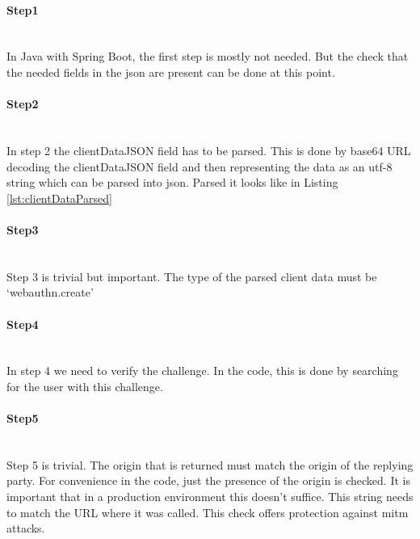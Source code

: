 \documentclass[a4paper, 11pt]{scrartcl}
\begin{document}


\paragraph{Step1} \hfill \\ 
In Java with Spring Boot, the first step is mostly not needed. But the check that the needed fields in the \gls{json} are present can be done at this point.

\paragraph{Step2} \hfill \\ 
In step 2 the clientDataJSON field has to be parsed. This is done by \gls{base64} URL decoding the clientDataJSON field and then representing the data as an \gls{utf-8} string which can be parsed into \gls{json}. Parsed it looks like in Listing \ref{lst:clientDataParsed}



\paragraph{Step3}\hfill \\ 
Step 3 is trivial but important. The type of the parsed client data must be `webauthn.create'

\paragraph{Step4}\hfill \\ 
In step 4 we need to verify the challenge. In the code, this is done by searching for the user with this challenge.

\paragraph{Step5}\hfill \\ 
Step 5 is trivial. The origin that is returned must match the origin of the replying party. For convenience in the code, just the presence of the origin is checked. It is important that in a production environment this doesn't suffice. This string needs to match the URL where it was called. This check offers protection against \gls{mitm} attacks.
\end{document}
